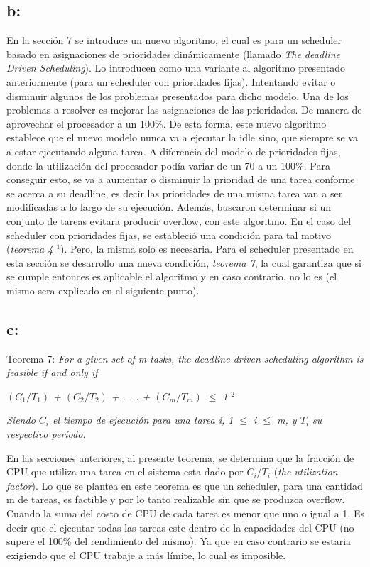 \documentclass[a4paper]{article}
\begin{document}
\subsection{b:}
En la sección 7 se introduce un nuevo algoritmo, el cual es para un scheduler basado en asignaciones de prioridades dinámicamente (llamado \textit{The deadline Driven Scheduling}). Lo introducen como una variante al algoritmo presentado anteriormente (para un scheduler con prioridades fijas). Intentando evitar o disminuir algunos de los problemas presentados para dicho modelo. \newline
Una de los problemas a resolver es mejorar las asignaciones de las prioridades. De manera de aprovechar el procesador a un 100\%. De esta forma, este nuevo algoritmo establece que el nuevo modelo nunca va a ejecutar la idle sino, que siempre se va a estar ejecutando alguna tarea. A diferencia del modelo de prioridades fijas, donde la utilización del procesador podía variar de un 70 a un 100\%. Para conseguir esto, se va a aumentar o disminuir la prioridad de una tarea conforme se acerca a su deadline, es decir las prioridades de una misma tarea van a ser modificadas a lo largo de su ejecución. Además, buscaron determinar si un conjunto de tareas evitara producir overflow, con este algoritmo. En el caso del scheduler con prioridades fijas, se estableció una condición para tal motivo (\textit{teorema 4 $^1$}). Pero, la misma solo es necesaria. Para el scheduler presentado en esta sección se desarrollo una nueva condición, \textit{teorema 7}, la cual garantiza que si se cumple entonces es aplicable el algoritmo y en caso contrario, no lo es (el mismo sera explicado en el siguiente punto). 
  
\subsection{c:}

Teorema 7:
\textit {For a given set of m tasks, the deadline driven scheduling algorithm
is feasible if and only if }\newline
 
 \textit {$(C_1/T_1)$ + $(C_2/T_2)$ + . . . + $(C_m/T_m)$ $\leq$ 1 } $^2$\newline

\textit{Siendo $C_i$ el tiempo de ejecuci\'on para una tarea i, 1 $\leq$ i $\leq$ m, y $T_i$ su respectivo per\'iodo.}

En las secciones anteriores, al presente teorema, se determina que la fracción de CPU que utiliza una tarea en el sistema esta dado por $C_i/T_i$ (\textit{the utilization factor}). Lo que se plantea en este teorema es que un scheduler, para una cantidad m de tareas, es factible y por lo tanto realizable sin que se produzca overflow. Cuando la suma del costo de CPU de cada tarea es menor que uno o igual a 1. Es decir que el ejecutar todas las tareas este dentro de la capacidades del CPU (no supere el 100\% del rendimiento del mismo). Ya que en caso contrario se estaria exigiendo que el CPU trabaje a más límite, lo cual es imposible. \newline
\end{document}
